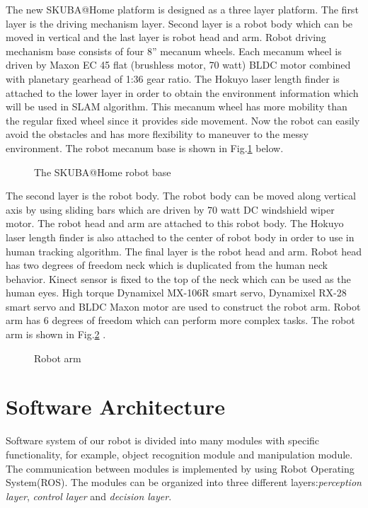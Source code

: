 \documentclass{llncs}
\begin{document}
The new SKUBA@Home platform is designed as a three layer platform. The first layer is the driving mechanism layer. Second layer is a robot body which can be moved in vertical and the last layer is robot head and arm. Robot driving mechanism base consists of four 8'' mecanum wheels. Each mecanum wheel is driven by Maxon EC 45 flat (brushless motor, 70 watt) BLDC motor combined with planetary gearhead of 1:36 gear ratio. The Hokuyo laser length finder is attached to the lower layer in
order to obtain the environment information which will be used
in SLAM algorithm. This mecanum
wheel has more mobility than the regular fixed wheel since it provides side movement. Now the robot can easily avoid the obstacles and has more flexibility to maneuver to the messy environment. The robot mecanum base is shown in Fig.\ref{fig:base} below.

\begin{figure}
\centering
\caption{The SKUBA@Home robot base}
\label{fig:base}
\end{figure}

The second layer is the robot body. The robot body can be moved along vertical axis by using sliding bars which are driven by 70 watt DC windshield wiper motor. The robot head and arm are attached to this robot body. The Hokuyo laser length finder is also attached to the center of robot body in order to use in human tracking algorithm. The final layer is the robot head and arm. Robot head has two degrees of freedom neck which is duplicated from the human neck behavior. Kinect sensor is fixed to the top of the neck which can be used as the human eyes. High torque Dynamixel MX-106R smart servo, Dynamixel RX-28 smart servo and BLDC Maxon motor are used to construct the robot arm. Robot arm has 6 degrees of freedom which can perform more complex tasks. The robot arm is shown in Fig.\ref{fig:arm} .

\begin{figure}
\centering
\caption{Robot arm}
\label{fig:arm}
\end{figure}

\section{Software Architecture}
Software system of our robot is divided into many modules with specific functionality, for example,
object recognition module and manipulation module. The communication between modules is implemented 
by using Robot Operating System(ROS). The modules can be organized into three different layers:\textit{perception layer}, \textit{control layer} and \textit{decision layer}.
\end{document}
